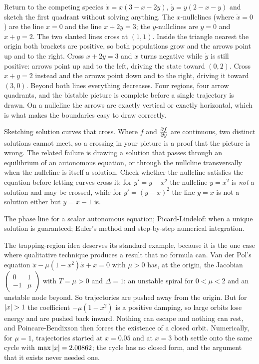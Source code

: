 \begin{worked}
Return to the competing species $\dot x=x(3-x-2y)$, $\dot y=y(2-x-y)$ and sketch the first quadrant without solving anything. The $x$-nullclines (where $\dot x=0$) are the line $x=0$ and the line $x+2y=3$; the $y$-nullclines are $y=0$ and $x+y=2$. The two slanted lines cross at $(1,1)$. Inside the triangle nearest the origin both brackets are positive, so both populations grow and the arrows point up and to the right. Cross $x+2y=3$ and $\dot x$ turns negative while $\dot y$ is still positive: arrows point up and to the left, driving the state toward $(0,2)$. Cross $x+y=2$ instead and the arrows point down and to the right, driving it toward $(3,0)$. Beyond both lines everything decreases. Four regions, four arrow quadrants, and the bistable picture is complete before a single trajectory is drawn. On a nullcline the arrows are exactly vertical or exactly horizontal, which is what makes the boundaries easy to draw correctly.
\end{worked}

\begin{trap}
Sketching solution curves that cross. Where $f$ and $\frac{\partial f}{\partial y}$ are continuous, two distinct solutions cannot meet, so a crossing in your picture is a proof that the picture is wrong. The related failure is drawing a solution that passes through an equilibrium of an autonomous equation, or through the nullcline transversally when the nullcline is itself a solution. Check whether the nullcline satisfies the equation before letting curves cross it: for $y'=y-x^{2}$ the nullcline $y=x^{2}$ is \emph{not} a solution and may be crossed, while for $y'=(y-x)^{2}$ the line $y=x$ is not a solution either but $y=x-1$ is.
\end{trap}

\begin{seealsob}The phase line for a scalar autonomous equation; Picard-Lindelof: when a unique solution is guaranteed; Euler's method and step-by-step numerical integration.\end{seealsob}

The trapping-region idea deserves its standard example, because it is the one case where qualitative technique produces a result that no formula can. Van der Pol's equation $\ddot x-\mu(1-x^{2})\dot x+x=0$ with $\mu>0$ has, at the origin, the Jacobian $\begin{pmatrix}0&1\\-1&\mu\end{pmatrix}$ with $T=\mu>0$ and $\Delta=1$: an unstable spiral for $0<\mu<2$ and an unstable node beyond. So trajectories are pushed away from the origin. But for $\left\lvert x\right\rvert>1$ the coefficient $-\mu(1-x^{2})$ is a positive damping, so large orbits lose energy and are pushed back inward. Nothing can escape and nothing can rest, and Poincare-Bendixson then forces the existence of a closed orbit. Numerically, for $\mu=1$, trajectories started at $x=0.05$ and at $x=3$ both settle onto the same cycle with $\max\left\lvert x\right\rvert=2.00862$; the cycle has no closed form, and the argument that it exists never needed one.


